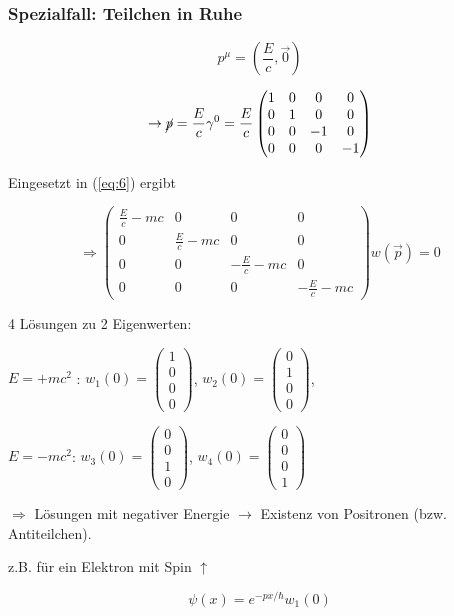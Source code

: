 \subsubsection{Spezialfall: Teilchen in Ruhe}

\[p^\mu = (\frac{E}{c},\vec 0)\]


\[\rightarrow \cancel p = \frac{E}{c}\gamma^0 = \frac{E}{c} \begin{pmatrix}1&0&0&0\\ 0&1&0&0\\0&0&-1&0\\0&0&0&-1\end{pmatrix} \]

Eingesetzt in (\ref{eq:6}) ergibt


\[\Rightarrow \begin{pmatrix}\frac{E}{c}-mc&0&0&0\\ 0&\frac{E}{c}-mc &0&0\\0&0&-\frac{E}{c}-mc&0\\0&0&0&-\frac{E}{c}-mc\end{pmatrix} w(\vec p) = 0\]


4 Lösungen zu 2 Eigenwerten:


\(E=+mc^2\) : \(w_1(0) =  \begin{pmatrix}1\\0\\0\\0\end{pmatrix}\), \(w_2(0) =  \begin{pmatrix}0\\1\\0\\0\end{pmatrix}\), 

\(E=-mc^2\): \(w_3(0) =  \begin{pmatrix}0\\0\\1\\0\end{pmatrix}\), \(w_4(0) =  \begin{pmatrix}0\\0\\0\\1\end{pmatrix}\)

\(\Rightarrow \) Lösungen mit negativer Energie \(\rightarrow \) Existenz von Positronen (bzw. Antiteilchen). 

z.B. für ein Elektron mit Spin \(\uparrow\)

\[ \psi(x) = e^{-px/\hbar}w_1(0) \]

